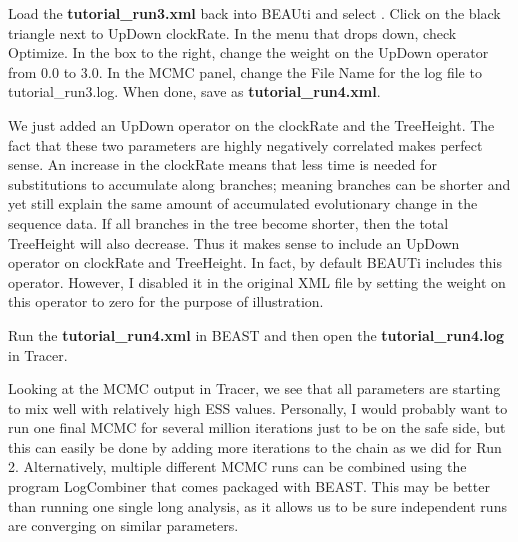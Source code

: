 \documentclass[11pt]{article}
\begin{document}
\begin{framed}
Load the \textbf{tutorial\_run3.xml} back into BEAUti and select . Click on the black triangle next to UpDown clockRate. In the menu that drops down, check Optimize. In the box to the right, change the weight on the UpDown operator from 0.0 to 3.0. In the MCMC panel, change the File Name for the log file to tutorial\_run3.log. When done, save as \textbf{tutorial\_run4.xml}.
\end{framed}

We just added an UpDown operator on the clockRate and the TreeHeight. The fact that these two parameters are highly negatively correlated makes perfect sense. An increase in the clockRate means that less time is needed for substitutions to accumulate along branches; meaning branches can be shorter and yet still explain the same amount of accumulated evolutionary change in the sequence data. If all branches in the tree become shorter, then the total TreeHeight will also decrease. Thus it makes sense to include an UpDown operator on clockRate and TreeHeight. In fact, by default BEAUTi includes this operator. However, I disabled it in the original XML file by setting the weight on this operator to zero for the purpose of illustration.

\begin{framed}
Run the \textbf{tutorial\_run4.xml} in BEAST and then open the \textbf{tutorial\_run4.log} in Tracer.
\end{framed}

Looking at the MCMC output in Tracer, we see that all parameters are starting to mix well with relatively high ESS values. Personally, I would probably want to run one final MCMC for several million iterations just to be on the safe side, but this can easily be done by adding more iterations to the chain as we did for Run 2.  Alternatively, multiple different MCMC runs can be combined using the program LogCombiner that comes packaged with BEAST. This may be better than running one single long analysis, as it allows us to be sure independent runs are converging on similar parameters.  
\end{document}
